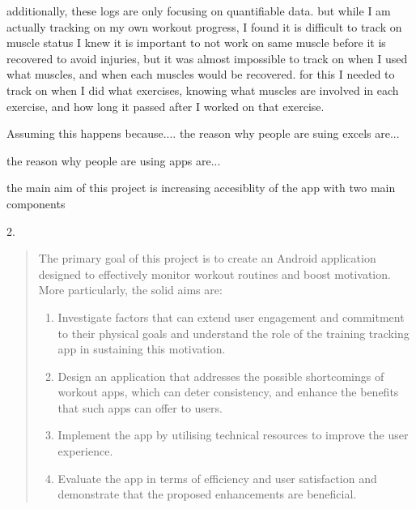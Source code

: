 additionally, these logs are only focusing on quantifiable data.
but while I am actually tracking on my own workout progress,
I found  it is difficult to track on muscle status
I knew it is important to not work on same muscle before it is recovered to avoid injuries,
but it was almost impossible to track on when I used what muscles, and when each muscles would be recovered.
for this I needed to track on when I did what exercises, 
knowing what muscles are involved in each exercise,
and how long it passed after I worked on that exercise.



Assuming this happens because.... 
the reason why people are suing excels are...


the reason why people are using apps are...

the main aim of this project is increasing accesiblity of the app
with two main components 


2.





\begin{quote}
\noindent
The primary goal of this project is to create an Android application designed to effectively monitor workout routines and boost motivation.
More particularly, the solid aims are: 

\begin{enumerate}
\item Investigate factors that can extend user engagement and commitment to their physical goals and understand the role of the training tracking app in sustaining this motivation.
\item Design an application that addresses the possible shortcomings of workout apps, which can deter consistency, and enhance the benefits that such apps can offer to users.
\item Implement the app by utilising technical resources to improve the user experience.
\item Evaluate the app in terms of efficiency and user satisfaction and demonstrate that the proposed enhancements are beneficial.

\end{enumerate}
\end{quote}
